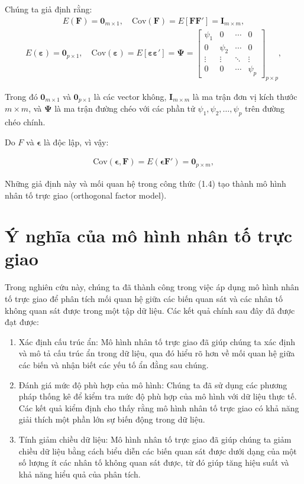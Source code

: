 Chúng ta giả định rằng:
\begin{eqnarray}
E(\mathbf{F}) = \mathbf{0}_{m \times 1}, \quad \text{Cov}(\mathbf{F}) = E[\mathbf{FF}'] = \mathbf{I}_{m \times m},
\end{eqnarray}
\begin{eqnarray}
E(\boldsymbol{\varepsilon}) = \mathbf{0}_{p \times 1}, \quad \text{Cov}(\boldsymbol{\varepsilon}) = E[\boldsymbol{\varepsilon} \boldsymbol{\varepsilon}'] = \boldsymbol{\Psi} =
\begin{bmatrix}
\psi_1 & 0 & \cdots & 0 \\
0 & \psi_2 & \cdots & 0 \\
\vdots & \vdots & \ddots & \vdots \\
0 & 0 & \cdots & \psi_p
\end{bmatrix}_{p \times p},
\end{eqnarray}

Trong đó \(\mathbf{0}_{m \times 1}\) và \(\mathbf{0}_{p \times 1}\) là các vector không, \(\mathbf{I}_{m \times m}\) là ma trận đơn vị kích thước \(m \times m\), và \(\boldsymbol{\Psi}\) là ma trận đường chéo với các phần tử \(\psi_1, \psi_2, \ldots, \psi_p\) trên đường chéo chính.

Do \(F\) và \(\boldsymbol{\epsilon}\) là độc lập, vì vậy:

\begin{eqnarray}
\text{Cov}(\boldsymbol{\epsilon}, \mathbf{F}) = E(\boldsymbol{\epsilon}\mathbf{F}') = \mathbf{0}_{p \times m},
\end{eqnarray}

Những giả định này và mối quan hệ trong công thức (1.4) tạo thành mô hình nhân tố trực giao (orthogonal factor model).

\section{Ý nghĩa của mô hình nhân tố trực giao}
Trong nghiên cứu này, chúng ta đã thành công trong việc áp dụng mô hình nhân tố trực giao để phân tích mối quan hệ giữa các biến quan sát và các nhân tố không quan sát được trong một tập dữ liệu. Các kết quả chính sau đây đã được đạt được:

\begin{enumerate}
    \item Xác định cấu trúc ẩn: Mô hình nhân tố trực giao đã giúp chúng ta xác định và mô tả cấu trúc ẩn trong dữ liệu, qua đó hiểu rõ hơn về mối quan hệ giữa các biến và nhận biết các yếu tố ẩn đằng sau chúng.
    \item Đánh giá mức độ phù hợp của mô hình: Chúng ta đã sử dụng các phương pháp thống kê để kiểm tra mức độ phù hợp của mô hình với dữ liệu thực tế. Các kết quả kiểm định cho thấy rằng mô hình nhân tố trực giao có khả năng giải thích một phần lớn sự biến động trong dữ liệu.
    \item Tính giảm chiều dữ liệu: Mô hình nhân tố trực giao đã giúp chúng ta giảm chiều dữ liệu bằng cách biểu diễn các biến quan sát được dưới dạng của một số lượng ít các nhân tố không quan sát được, từ đó giúp tăng hiệu suất và khả năng hiểu quả của phân tích.
\end{enumerate}

